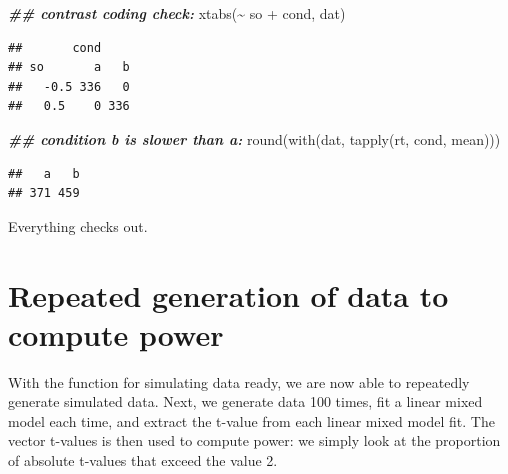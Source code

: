 \documentclass[
  12pt,
]{krantz}
\newenvironment{Shaded}{\begin{snugshade}}{\end{snugshade}}
\newcommand{\DocumentationTok}[1]{\textcolor[rgb]{0.56,0.35,0.01}{\textbf{\textit{#1}}}}
\newcommand{\FunctionTok}[1]{\textcolor[rgb]{0.00,0.00,0.00}{#1}}
\newcommand{\NormalTok}[1]{#1}
\newcommand{\SpecialCharTok}[1]{\textcolor[rgb]{0.00,0.00,0.00}{#1}}
\theoremstyle{definition}
\theoremstyle{definition}
\theoremstyle{definition}
\theoremstyle{definition}
\theoremstyle{remark}
\begin{document}
\begin{Shaded}
\begin{Highlighting}[]
\DocumentationTok{\#\#  contrast coding check:}
\FunctionTok{xtabs}\NormalTok{(}\SpecialCharTok{\textasciitilde{}}\NormalTok{ so }\SpecialCharTok{+}\NormalTok{ cond, dat)}
\end{Highlighting}
\end{Shaded}

\begin{verbatim}
##       cond
## so       a   b
##   -0.5 336   0
##   0.5    0 336
\end{verbatim}

\begin{Shaded}
\begin{Highlighting}[]
\DocumentationTok{\#\# condition b is slower than a:}
\FunctionTok{round}\NormalTok{(}\FunctionTok{with}\NormalTok{(dat, }\FunctionTok{tapply}\NormalTok{(rt, cond, mean)))}
\end{Highlighting}
\end{Shaded}

\begin{verbatim}
##   a   b 
## 371 459
\end{verbatim}

Everything checks out.

\hypertarget{repeated-generation-of-data-to-compute-power}{%
\section{Repeated generation of data to compute power}\label{repeated-generation-of-data-to-compute-power}}

With the function for simulating data ready, we are now able to repeatedly generate simulated data. Next, we generate data 100 times, fit a linear mixed model each time, and extract the t-value from each linear mixed model fit. The vector t-values is then used to compute power: we simply look at the proportion of absolute t-values that exceed the value 2.
\end{document}
